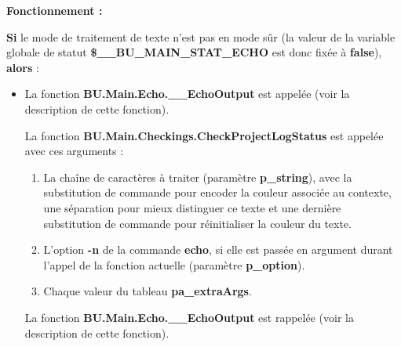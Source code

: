 \documentclass[a4paper,10pt]{article}
\begin{document}
    \begin{justify}
        \setlength{\parskip}{1em}

        \textbf{Fonctionnement :}

        \textbf{\color{cond}Si} le mode de traitement de texte n'est pas en mode sûr (la valeur de la variable globale de statut \textbf{\color{vars}\$\_\_BU\_MAIN\_STAT\_ECHO} est donc fixée à \textbf{false}), \textbf{\color{cond}alors} :

        \begin{itemize}
            \item
            {
                \begin{justify}
                    La fonction \textbf{\color{func}BU.Main.Echo.\_\_EchoOutput} est appelée (voir la description de cette fonction).
                \end{justify}

                \setlength{\parskip}{1em}

                \begin{justify}
                    La fonction \textbf{\color{func}BU.Main.Checkings.CheckProjectLogStatus} est appelée avec ces arguments :
                    \begin{enumerate}
                        \item La chaîne de caractères à traiter (paramètre \textbf{\color{vars}p\_string}), avec la substitution de commande pour encoder la couleur associée au contexte, une séparation pour mieux distinguer ce texte et une dernière substitution de commande pour réinitialiser la couleur du texte.

                        \item L'option \textbf{\color{cmds}-n} de la commande \textbf{\color{cmds}echo}, si elle est passée en argument durant l'appel de la fonction actuelle (paramètre \textbf{\color{vars}p\_option}).

                        \item Chaque valeur du tableau \textbf{\color{vars}pa\_extraArgs}.
                    \end{enumerate}
                \end{justify}

                \setlength{\parskip}{1em}

                \begin{justify}
                    La fonction \textbf{\color{func}BU.Main.Echo.\_\_EchoOutput} est rappelée (voir la description de cette fonction).
                \end{justify}
            }
        \end{itemize}
    \end{justify}
\end{document}
